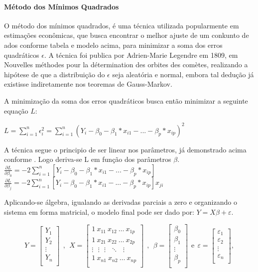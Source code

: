 \documentclass[	12pt, Times, openright, twoside, a4paper, english, brazil]{abntex2}
\begin{document}
          \paragraph*{Método dos Mínimos Quadrados}
          O método dos mínimos quadrados, é uma técnica utilizada popularmente em estimações econômicas, que busca encontrar o melhor ajuste de um conkunto de ados conforme tabela e modelo acima, para minimizar a soma dos erros quadráticos $\epsilon$. A técnica foi publica por Adrien-Marie Legendre em 1809, em Nouvelles méthodes pour la détermination des orbites des comètes, realizando a hipótese de que a distribuição do $\epsilon$ seja aleatória e normal, embora tal dedução já existisse indiretamente nos teoremas de Gauss-Markov.
          
          A minimização da soma dos erros quadráticos busca então minimizar a seguinte equação $L$:
          
          $L = \sum_{i=1}^{n} \epsilon_i^2 = \sum_{i=1}^{n}(Y_i-\beta_0-\beta_1*x_{i1}-...-\beta_p*x_{ip})^2$
          
           A técnica segue o principio de ser linear nos parâmetros, já demonstrado acima conforme \cite{Clarice2011}.
           Logo deriva-se L em função dos parâmetros $\beta$.\\
           $\frac {\partial L}{\partial \beta_0} = -2 \sum_{i=1}^{n}[Y_i-\beta_0-\beta_1*x_{i1}-...-\beta_p*x_{ip}]$\\
           $\frac {\partial L}{\partial \beta_j} = -2 \sum_{i=1}^{n}[Y_i-\beta_0-\beta_1*x_{i1}-...-\beta_p*x_{ip}]x_{ji}$
          
          Aplicando-se álgebra, igualando as derivadas parciais a zero e organizando o sistema em forma matricial, o modelo final pode ser dado por: $Y=X\beta+\varepsilon$.
          
          $$Y=\left[\begin{array}{c}Y_1\\Y_2\\\vdots\\Y_n\\\end{array} \right]~~,~~X=\left[\begin{array}{ccccc}1~x_{11}~ x_{12}~\ldots~x_{1p}\\1~x_{21}~x_{22}~\ldots~x_{2p}\\\vdots~~~\vdots~~~\vdots~~~\ddots~~~\vdots\\1~x_{n1}~x_{n2}~\ldots~x_{np}\\\end{array} \right]~~,~~\beta=\left[ \begin{array}{c}\beta_0\\\beta_1\\\vdots\\\beta_p\\\end{array} \right]~~\mbox{e}~~ \varepsilon=\left[ \begin{array}{c}\varepsilon_1\\\varepsilon_2\\\vdots\\\varepsilon_n\\\end{array}\right],$$
          
\end{document}
